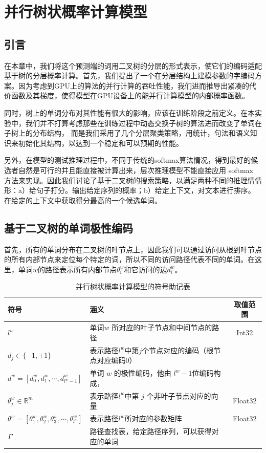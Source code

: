 \chapter{并行树状概率计算模型}
\section{引言}
在本章中，我们将这个预测端的词用二叉树的分层的形式表示，使它们的编码适配基于树的分层概率计算。首先，我们提出了一个在分层结构上建模参数的字编码方案。因为考虑到GPU上的算法的并行计算的吞吐性能，我们进而推导出紧凑的代价函数及其梯度，使得模型在GPU设备上的能并行计算模型的内部概率函数。

同时，树上的单词分布对其性能有很大的影响，应该在训练阶段之前定义。在本实验中，我们并不打算考虑那些在训练过程中动态交换子树的算法进而改变了单词在子树上的分布结构， 而是我们采用了几个分层聚类策略，用统计，句法和语义知识来初始化其结构，以达到一个稳定和可以预期的性能。

另外，在模型的测试推理过程中，不同于传统的softmax算法情况，得到最好的候选者自然是可行的并且能直接被计算出来，层次推理模型不能直接应用 softmax 方法来实现。因此我们讨论了基于二叉树的搜索策略，以满足两种不同的推理情情形：a）给句子打分。输出给定序列的概率；b）给定上下文，对文本进行排序。在给定的上下文中获取得分最高的一个候选单词。
\section{基于二叉树的单词极性编码}
首先，所有的单词分布在二叉树的叶节点上，因此我们可以通过访问从根到叶节点的所有内部节点来定位每个特定的词，所以不同的访问路径代表不同的单词。在这里，单词$ w $的路径表示所有内部节点$ \theta^w_i $和它访问的边$ d ^ w_i $。

\begin{table}[!ht]
  \centering
  \caption{并行树状概率计算模型的符号助记表}
\begin{tabular}{llc}
  \toprule
   符号&涵义&取值范围\\ \midrule
$l^w$ &单词$w$ 所对应的叶子节点和中间节点的路径&Int32 \\
$d_j\in \{-1,+1\}$&表示路径$l^w$中第$j$个节点对应的编码（根节点对应编码$0$）&\\
$ d^w=[d_0^w,d_1^w,\cdots,d_{l^w-1}^w] $& 单词 $w$ 的极性编码，他由 $l^w-1$位编码构成，&\\
$\theta_{j}^w\in\mathbb{R}^m$ &表示路径$l^w$中第 $j$ 个非叶子节点对应的向量& Float32\\
$ \theta^w=[\theta_1^w,\theta_2^w,\theta_3^w, \cdots,\theta_{l^w}^w]$&表示路径$l^w$所对应的参数矩阵&Float32 \\
$\Gamma$ &路径查找表，给定路径序列，可以获得对应的单词& \\
  \bottomrule
\end{tabular}
\end{table}

